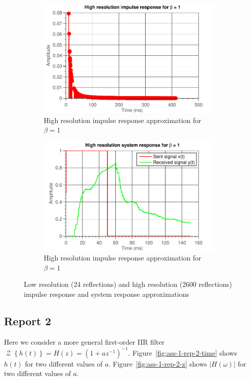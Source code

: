 \documentclass[11pt,titlepage]{report}
\begin{document}
\begin{figure}[H]
\begin{subfigure}{0.49\textwidth}
		\includegraphics[width=\textwidth]{../../deliverable-7-resources/figures/ass-1/report-1/ass-1-report-1-impulse-response-25-copies-beta-1.pdf}
		\caption{\centering High resolution impulse response approximation for $\beta=1$}
	\end{subfigure}
	\begin{subfigure}{0.49\textwidth}
		\includegraphics[width=\textwidth]{../../deliverable-7-resources/figures/ass-1/report-1/ass-1-report-1-system-response-25-copies-beta-1.pdf}
		\caption{\centering High resolution impulse response approximation for $\beta=1$}
	\end{subfigure}
	\caption{Low resolution (\num{24} reflections) and high resolution (\num{2600} reflections) impulse response and system response approximations}
	\label{fig:ass-1-rep-1-refl}
\end{figure}

\subsection{Report 2}
Here we consider a more general first-order IIR filter $\operatorname{\mathcal{Z}}\left\{h(t)\right\}=H(z) = (1+az^{-1})^{-1}$. Figure~\ref{fig:ass-1-rep-2-time} shows $h(t)$ for two different values of $a$. Figure~\ref{fig:ass-1-rep-2-z} shows $|H(\omega)|$ for two different values of $a$.
\end{document}

